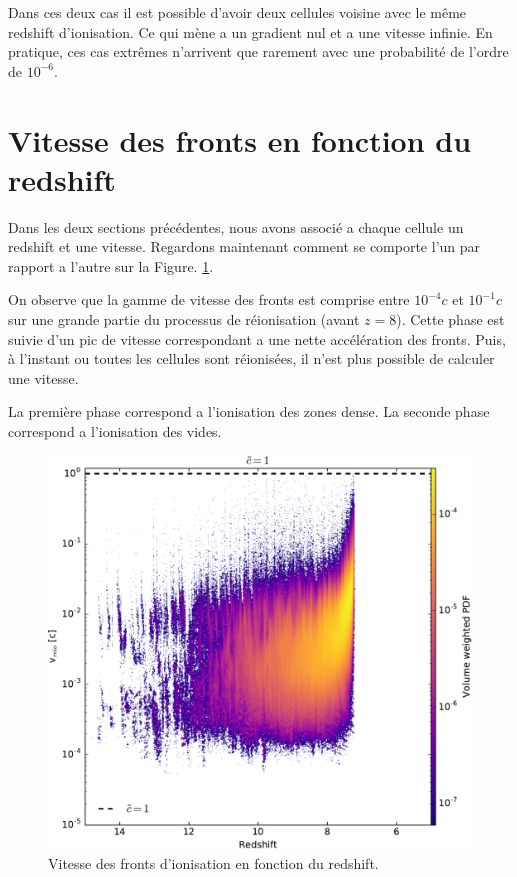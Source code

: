 Dans ces deux cas il est possible d'avoir deux cellules voisine avec le même redshift d'ionisation.
Ce qui mène a un gradient nul et a une vitesse infinie.
En pratique, ces cas extrêmes n'arrivent que rarement avec une probabilité de l'ordre de $10^{-6}$.


\section{Vitesse des fronts en fonction du redshift}

Dans les deux sections précédentes, nous avons associé a chaque cellule un redshift et une vitesse.
Regardons maintenant comment se comporte l'un par rapport a l'autre sur la Figure. \ref{fig:speedz}.

On observe que la gamme de vitesse des fronts est comprise entre $10^{-4}c$ et $10^{-1}c$ sur une grande partie du processus de réionisation (avant $z=8$).
Cette phase est suivie d'un pic de vitesse correspondant a une nette accélération des fronts. 
Puis, à l'instant ou toutes les cellules sont réionisées, il n'est plus possible de calculer une vitesse.

La première phase correspond a l'ionisation des zones dense.
La seconde phase correspond a l'ionisation des vides.

\begin{figure}
        \includegraphics[width=.95\linewidth]{img/04_mapreio/speedreio_z_c1.pdf} 
        \caption[Évolution de la vitesse des fronts]{Vitesse des fronts d'ionisation en fonction du redshift.
 		\label{fig:speedz}}
\end{figure}



